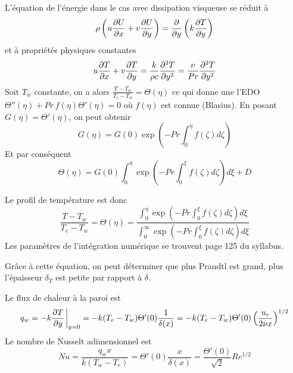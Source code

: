       L'équation de l'énergie dans le cas avec dissipation visqueuse se réduit à
      \begin{equation}
        \rho \left(u \pdv{U}{x} + v \pdv{U}{y}\right) = \pdv{y} \left(k \pdv{T}{y}\right)
      \end{equation}
      et à propriétés physiques constantes
      \begin{equation}
        u\pdv{T}{x} + v \pdv{T}{y} = \frac{k}{\rho c} \pdv[2]{T}{y} = \frac{\nu}{Pr} \pdv[2]{T}{y}
      \end{equation}
      Soit $T_w$ constante, on a alors $\frac{T - T_w}{T_e - T_w} = \Theta(\eta)$ ce qui donne une l'EDO $\Theta'' (\eta) + Pr~f(\eta) \Theta'(\eta) = 0$ où $f(\eta)$ est connue (Blasius). En posant $G(\eta) = \Theta'(\eta)$, on peut obtenir
      \begin{equation}
        G(\eta) = G(0) \exp\left(-Pr \int_0^\eta f(\zeta) d\zeta\right)
      \end{equation}
      Et par conséquent
      \begin{equation}
        \Theta(\eta) = G(0) \int_0^\eta \exp \left(-Pr \int_0^\xi f(\zeta) d\zeta\right) d\xi + D
      \end{equation}

      Le profil de température est donc
      \begin{equation}
        \frac{T-T_w}{T_e - T_w} = \Theta(\eta) = \frac{\int_0^\eta \exp\left(-Pr \int_0^\xi f(\zeta) d\zeta\right) d\xi}{\int_0^\infty \exp\left(-Pr \int_0^\xi f(\zeta) d\zeta\right) d\xi}
      \end{equation}
      Les paramètres de l'intégration numérique se trouvent page 125 du syllabus.

      Grâce à cette équation, on peut déterminer que plus Prandtl est grand, plus l'épaisseur $\delta_T$ est petite par rapport à $\delta$.

      Le flux de chaleur à la paroi est
      \begin{equation}
        q_w = -k \pdv{T}{y} \eval_{y=0} = -k(T_e - T_w) \Theta'(0) \recip{\delta(x)} = -k (T_e - T_w) \Theta'(0) \left(\frac{u_e}{2\nu x}\right)^{1/2}
      \end{equation}
      Le nombre de Nusselt adimensionnel est
      \begin{equation}
        Nu = \frac{q_w x}{k (T_w - T_e)} = \Theta'(0) \frac{x}{\delta(x)} = \frac{\Theta'(0)}{\sqrt{2}} Re^{1/2}
      \end{equation}

